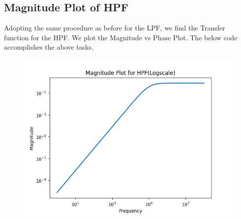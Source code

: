 \documentclass[12pt, a4paper]{report}
\begin{document}
\subsection{Magnitude Plot of HPF}
Adopting the same procedure as before for the LPF, we find the Transfer function for the HPF. We plot the Magnitude vs Phase Plot. The below code accomplishes the above tasks.
\noindent

\vspace{100mm}
\begin{figure}[h!]
    \centering
    \includegraphics[scale=0.75]{fig3.png} 
    \caption{}
    \label{fig:my_label}
\end{figure}
\end{document}

